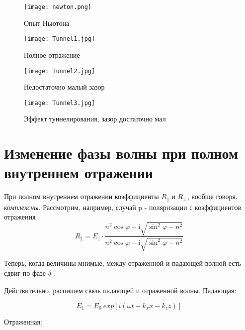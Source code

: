 	\newpage
	\begin{figure}[h]
		\centering
		\texttt{[image: newton.png]}
		\caption*{Опыт Ньютона}
	\end{figure}

	\begin{figure}[h!]
		\centering
		\begin{minipage}{0.4\linewidth}
	\texttt{[image: Tunnel1.jpg]}
	\caption*{Полное отражение}
		\end{minipage}
		\begin{minipage}{0.4\linewidth}
			\texttt{[image: Tunnel2.jpg]}
			\caption*{Недостаточно малый зазор}
		\end{minipage}
	
		\begin{minipage}{0.4\linewidth}
		\texttt{[image: Tunnel3.jpg]}
		\caption*{Эффект туннелирования, зазор достаточно мал}
	\end{minipage}
	\end{figure}





	
	
	
	
	
	
	\section{Изменение фазы волны при полном внутреннем отражении}
	
	При полном внутреннем отражении коэффициенты $ R_{\parallel} $ и $ R_{\perp} $, вообще говоря, \textit{комплексны}. Рассмотрим, например, случай p - поляризации с коэффициентов отражения 
	\[ R_{\parallel} = E_{\parallel} \cdot \frac { n^{2} \cos{ \varphi  + \text{i} \sqrt{\sin^{2}{\varphi}  - n^2}  } } { n^{2} \cos{ \varphi  - \text{i} \sqrt{\sin^{2}{\varphi}  - n^2}  } } \]

	Теперь, когда величины мнимые, между отраженной и падающей волной есть сдвиг по фазе $ \delta_{\parallel} $.
	
	Действительно, распишем связь падающей и отраженной волны. Падающая:
	
	\[E_{1} = E_{0} \ exp[ i (\omega t - k_{x} x - k_{z} z)] \]
	
	Отраженная:
	

